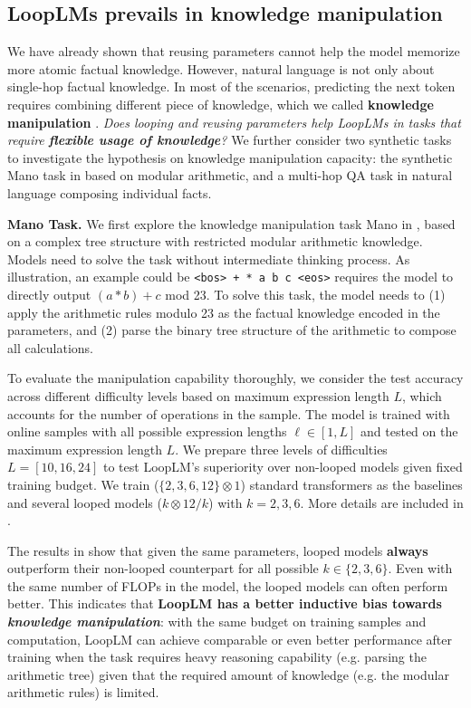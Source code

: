 \documentclass[]{bytedance_seed}
\newcommand{\1}{\mathbf{1}}
\newcommand{\ut}{LoopLM}
\begin{document}
\subsection{\ut{}s prevails in knowledge manipulation}
\label{subsec:manipulation}
We have already shown that reusing parameters cannot help the model memorize more atomic factual knowledge. However, natural language is not only about single-hop factual knowledge. In most of the scenarios, predicting the next token requires combining different piece of knowledge, which we called \textbf{knowledge manipulation} \cite{AL2024-knowledge3}. \textit{Does looping and reusing parameters help \ut{}s in tasks that require \textbf{flexible usage of knowledge}?} We further consider two synthetic tasks to investigate the hypothesis on {{knowledge manipulation}} capacity: the synthetic Mano task in \cite{Allenzhu2025-canon} based on modular arithmetic, and a multi-hop QA task in natural language \cite{yao2025language} composing individual facts. 

\textbf{Mano Task.} We first explore the knowledge manipulation task Mano in \cite{Allenzhu2025-canon}, based on a complex tree structure with restricted modular arithmetic knowledge. Models need to solve the task without intermediate thinking process. As illustration, an example could be \texttt{<bos> + * a b c <eos>} requires the model to directly output $(a*b)+c$ mod 23. To solve this task, the model needs to (1) apply the arithmetic rules modulo 23 as the factual knowledge encoded in the parameters, and (2) parse the binary tree structure of the arithmetic to compose all calculations. 

To evaluate the manipulation capability thoroughly, we consider the test accuracy across different difficulty levels based on maximum expression length $L$, which accounts for the number of operations in the sample. The model is trained with online samples with all possible expression lengths $\ell\in[1, L]$ and tested on the maximum expression length $L$. We prepare three levels of difficulties $L=[10, 16, 24]$ to test \ut{}'s superiority over non-looped models given fixed training budget. We train ($\{2,3,6,12\}\otimes 1$) standard transformers as the baselines and several looped models ($k\otimes 12/k$) with $k=2,3,6$. More details are included in . 

The results in  show that given the same parameters, looped models \textbf{always} outperform their non-looped counterpart for all possible $k\in\{2,3,6\}$. Even with the same number of FLOPs in the model, the looped models can often perform better. This indicates that\textbf{ \ut{} has a better inductive bias towards \textit{knowledge manipulation}}: with the same budget on training samples and computation, \ut{} can achieve comparable or even better performance after training when the task requires heavy reasoning capability (e.g. parsing the arithmetic tree) given that the required amount of knowledge (e.g. the modular arithmetic rules) is limited. 
\end{document}
